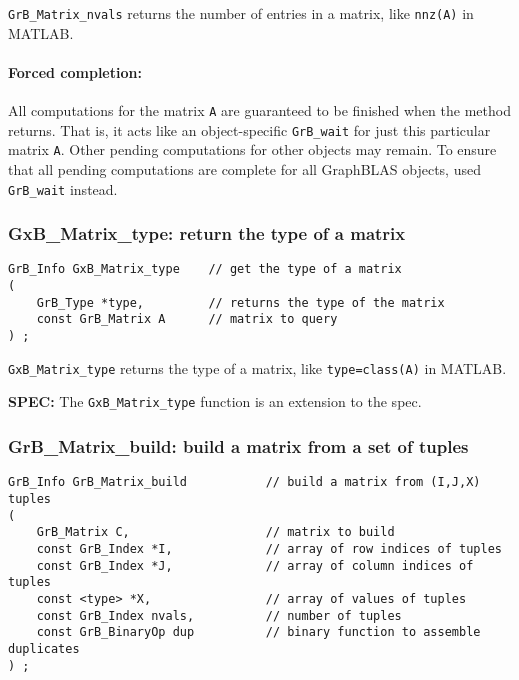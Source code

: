 \documentclass[12pt]{article}
\begin{document}
\verb'GrB_Matrix_nvals' returns the number of entries in a matrix, like
\verb'nnz(A)' in MATLAB.

\paragraph{Forced completion:}
All computations for the matrix \verb'A' are guaranteed to be finished when the
method returns.  That is, it acts like an object-specific \verb'GrB_wait' for
just this particular matrix \verb'A'.  Other pending computations for other
objects may remain.  To ensure that all pending computations are complete for
all GraphBLAS objects, used \verb'GrB_wait' instead.

\subsubsection{{\sf GxB\_Matrix\_type:}         return the type of a matrix}
\label{matrix_type}

\begin{mdframed}[userdefinedwidth=6in]
{\footnotesize
\begin{verbatim}
GrB_Info GxB_Matrix_type    // get the type of a matrix
(
    GrB_Type *type,         // returns the type of the matrix
    const GrB_Matrix A      // matrix to query
) ;
\end{verbatim} } \end{mdframed}

\verb'GxB_Matrix_type' returns the type of a matrix, like \verb'type=class(A)'
in MATLAB.

\begin{spec}
{\bf SPEC:} The \verb'GxB_Matrix_type' function is an extension to the spec.
\end{spec}

\newpage
\subsubsection{{\sf GrB\_Matrix\_build:} build a matrix from a set of tuples}
\label{matrix_build}

\begin{mdframed}[userdefinedwidth=6in]
{\footnotesize
\begin{verbatim}
GrB_Info GrB_Matrix_build           // build a matrix from (I,J,X) tuples
(
    GrB_Matrix C,                   // matrix to build
    const GrB_Index *I,             // array of row indices of tuples
    const GrB_Index *J,             // array of column indices of tuples
    const <type> *X,                // array of values of tuples
    const GrB_Index nvals,          // number of tuples
    const GrB_BinaryOp dup          // binary function to assemble duplicates
) ;
\end{verbatim} } \end{mdframed}
\end{document}
